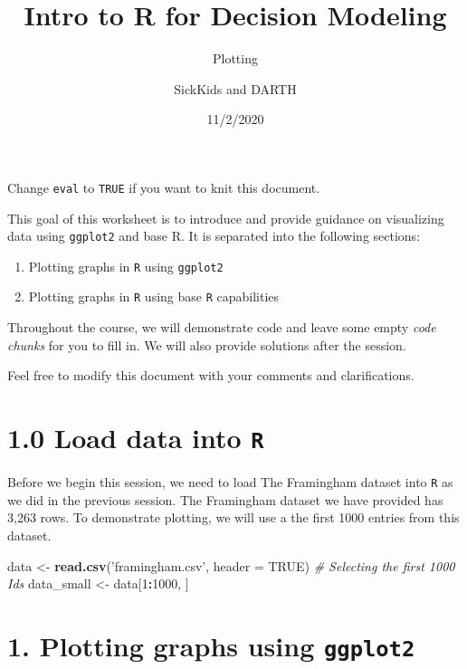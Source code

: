 \documentclass[
]{article}
\title{Intro to R for Decision Modeling}
\subtitle{Plotting}
\author{SickKids and DARTH}
\date{11/2/2020}
\newenvironment{Shaded}{\begin{snugshade}}{\end{snugshade}}
\newcommand{\CommentTok}[1]{\textcolor[rgb]{0.56,0.35,0.01}{\textit{#1}}}
\newcommand{\DataTypeTok}[1]{\textcolor[rgb]{0.13,0.29,0.53}{#1}}
\newcommand{\DecValTok}[1]{\textcolor[rgb]{0.00,0.00,0.81}{#1}}
\newcommand{\KeywordTok}[1]{\textcolor[rgb]{0.13,0.29,0.53}{\textbf{#1}}}
\newcommand{\NormalTok}[1]{#1}
\newcommand{\OperatorTok}[1]{\textcolor[rgb]{0.81,0.36,0.00}{\textbf{#1}}}
\newcommand{\OtherTok}[1]{\textcolor[rgb]{0.56,0.35,0.01}{#1}}
\newcommand{\StringTok}[1]{\textcolor[rgb]{0.31,0.60,0.02}{#1}}
\begin{document}
\maketitle

Change \texttt{eval} to \texttt{TRUE} if you want to knit this document.

This goal of this worksheet is to introduce and provide guidance on
visualizing data using \texttt{ggplot2} and base R. It is separated into
the following sections:

\begin{enumerate}
\def\labelenumi{\arabic{enumi}.}
\item
  Plotting graphs in \texttt{R} using \texttt{ggplot2}
\item
  Plotting graphs in \texttt{R} using base \texttt{R} capabilities
\end{enumerate}

Throughout the course, we will demonstrate code and leave some empty
\emph{code chunks} for you to fill in. We will also provide solutions
after the session.

Feel free to modify this document with your comments and clarifications.

\hypertarget{load-data-into-r}{%
\section{\texorpdfstring{1.0 Load data into
\texttt{R}}{1.0 Load data into R}}\label{load-data-into-r}}

Before we begin this session, we need to load The Framingham dataset
into \texttt{R} as we did in the previous session. The Framingham
dataset we have provided has 3,263 rows. To demonstrate plotting, we
will use a the first 1000 entries from this dataset.

\begin{Shaded}
\begin{Highlighting}[]
\NormalTok{data <-}\StringTok{ }\KeywordTok{read.csv}\NormalTok{(}\StringTok{'framingham.csv'}\NormalTok{, }\DataTypeTok{header =} \OtherTok{TRUE}\NormalTok{)}
\CommentTok{# Selecting the first 1000 Ids}
\NormalTok{data_small <-}\StringTok{ }\NormalTok{data[}\DecValTok{1}\OperatorTok{:}\DecValTok{1000}\NormalTok{, ]}
\end{Highlighting}
\end{Shaded}

\hypertarget{plotting-graphs-using-ggplot2}{%
\section{\texorpdfstring{1. Plotting graphs using
\texttt{ggplot2}}{1. Plotting graphs using ggplot2}}\label{plotting-graphs-using-ggplot2}}
\end{document}
